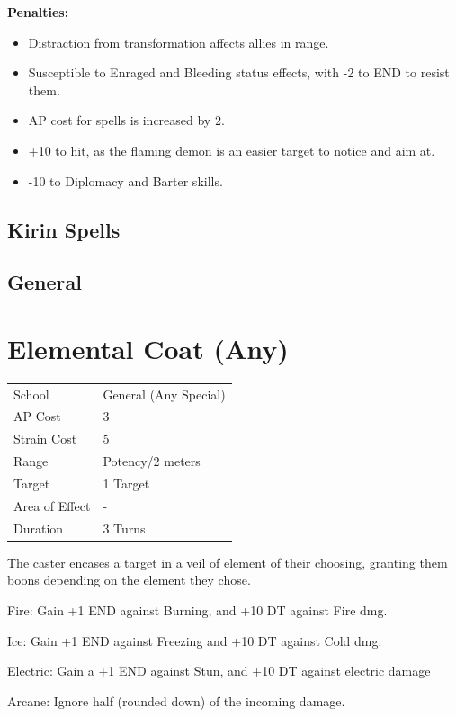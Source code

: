 \documentclass[11pt,a4paper,twocolumn]{book}
\begin{document}
	\textbf{Penalties:}
	\begin{itemize}
		\item Distraction from transformation affects allies in range.
		\item Susceptible to Enraged and Bleeding status effects, with -2 to END to resist them.
		\item AP cost for spells is increased by 2.
		\item +10 to hit, as the flaming demon is an easier target to notice and aim at.
		\item -10 to Diplomacy and Barter skills.
	\end{itemize}
	
	\subsection*{Kirin Spells}
	
	\subsection*{General}
			
			\section*{Elemental Coat (Any)}
	{
		\begin{tabu} to 75mm{| X[l,4] | X[l,7] |}
			\hline
			School 			&  General (Any Special)\\
			AP Cost	      	&  3				\\
			Strain Cost     &  5				\\
			Range     		&  Potency/2 meters	\\
			Target      	&  1 Target			\\
			Area of Effect  &  -	 			\\
			Duration     	&  3 Turns			\\ \hline
		\end{tabu}
		
	}
	
	\medskip
	
	The caster encases a target in a veil of  element of their choosing, granting them boons depending on the element they chose.
	
	\begin{compactitem}
		\item Fire: Gain +1 END against Burning, and +10 DT against Fire dmg.
		\item Ice: Gain +1 END against Freezing and +10 DT against Cold dmg.
		\item Electric: Gain a +1 END against Stun, and +10 DT against electric damage
		\item Arcane: Ignore half (rounded down) of the incoming damage.
	\end{compactitem}
	
\end{document}
